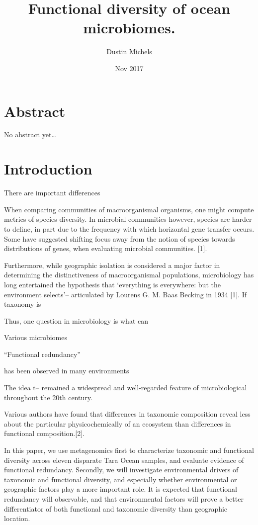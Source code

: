\documentclass[12pt,a4paper,]{article}
\title{Functional diversity of ocean microbiomes.}
\author{Dustin Michels}
\date{Nov 2017}
\begin{document}
\maketitle

\section{Abstract}\label{abstract}

No abstract yet\ldots{}

\section{Introduction}\label{introduction}

There are important differences

When comparing communities of macroorganismal organisms, one might
compute metrics of species diversity. In microbial communities however,
species are harder to define, in part due to the frequency with which
horizontal gene transfer occurs. Some have suggested shifting focus away
from the notion of species towards distributions of genes, when
evaluating microbial communities. {[}1{]}.

Furthermore, while geographic isolation is considered a major factor in
determining the distinctiveness of macroorganismal populations,
microbiology has long entertained the hypothesis that `everything is
everywhere: but the environment selects'-- articulated by Lourens G. M.
Baas Becking in 1934 {[}1{]}. If taxonomy is

Thus, one question in microbiology is what can

Various microbiomes

``Functional redundancy''

has been observed in many environments

The idea t-- remained a widespread and well-regarded feature of
microbiological throughout the 20th century.

Various authors have found that differences in taxonomic composition
reveal less about the particular physicochemically of an ecosystem than
differences in functional composition.{[}2{]}.

In this paper, we use metagenomics first to characterize taxonomic and
functional diversity across eleven disparate Tara Ocean samples, and
evaluate evidence of functional redundancy. Secondly, we will
investigate environmental drivers of taxonomic and functional diversity,
and especially whether environmental or geographic factors play a more
important role. It is expected that functional redundancy will
observable, and that environmental factors will prove a better
differentiator of both functional and taxonomic diversity than
geographic location.
\end{document}
